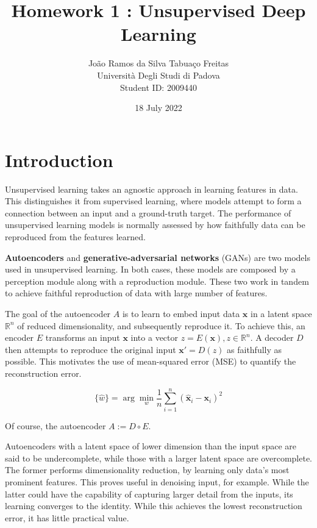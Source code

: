 \documentclass[11pt]{article} %
\title{Homework 1 : Unsupervised Deep Learning}
\author{João Ramos da Silva Tabuaço Freitas \\ Università Degli Studi di Padova \\ Student ID: 2009440}
\date{18 July 2022} %
\begin{document}
\maketitle

\section*{Introduction}
Unsupervised learning takes an agnostic approach in learning features in data. This distinguishes it from supervised learning, where models attempt to form a connection between an input and a ground-truth target. The performance of unsupervised learning models is normally assessed by how faithfully data can be reproduced from the features learned.

\textbf{Autoencoders} and \textbf{generative-adversarial networks} (GANs) are two models used in unsupervised learning. In both cases, these models are composed by a perception module along with a reproduction module. These two work in tandem to achieve faithful reproduction of data with large number of features.

\noindent The goal of the autoencoder $A$ is to learn to embed input data $\mathbf{x}$ in a latent space $\mathbb{R}^{n}$ of reduced dimensionality, and subsequently reproduce it. To achieve this, an encoder $E$ transforms an input $\mathbf{x}$ into a vector $z = E(\mathbf{x}), z \in \mathbb{R}^{n}$. A decoder $D$ then attempts to reproduce the original input $\mathbf{x}' = D(z)$ as faithfully as possible. This motivates the use of mean-squared error (MSE) to quantify the reconstruction error.

\begin{equation}
    \{\hat{w}\}= \arg\min_{w} \frac{1}{n}\sum_{i = 1}^{n}\left(\hat{\mathbf{x}}_i - \mathbf{x}_i\right)^{2}
\end{equation}

\noindent Of course, the autoencoder $A := D \circ E$.

\noindent Autoencoders with a latent space of lower dimension than the input space are said to be undercomplete, while those with a larger latent space are overcomplete. The former performs dimensionality reduction, by learning only data's most prominent features. This proves useful in denoising input, for example. While the latter could have the capability of capturing larger detail from the inputs, its learning converges to the identity. While this achieves the lowest reconstruction error, it has little practical value.
\end{document}

